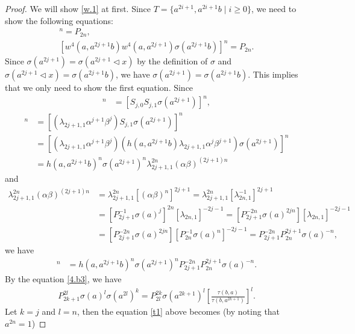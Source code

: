 \documentclass[a4paper,11pt]{amsart}
\numberwithin{equation}{section}
\begin{document}
\begin{proof}
We will show  \eqref{w.1} at first. Since $T=\{a^{2i+1},a^{2i+1}b\;|\;i\geq 0\}$, we need to show the following equations:
\begin{gather*}
[w^4(a,a^{2j+1}) w^4(a,a^{2j+1}b) \sigma(a^{2j+1})]^n=P_{2n},\\
[w^4(a,a^{2j+1}b) w^4(a,a^{2j+1}) \sigma(a^{2j+1}b)]^n=P_{2n}.
\end{gather*}
Since $\sigma(a^{2j+1})=\sigma(a^{2j+1}\triangleleft x)$ by the definition of $\sigma$ and $\sigma(a^{2j+1}\triangleleft x)=\sigma(a^{2j+1}b)$, we have $\sigma(a^{2j+1})=\sigma(a^{2j+1}b)$. This implies that we only need to show the first equation. Since
\begin{align*}
[w^4(a,a^{2j+1}) w^4(a,a^{2j+1}b) \sigma(a^{2j+1})]^n&=[S_{j,0} S_{j,1} \sigma(a^{2j+1})]^{n},
\end{align*}
\begin{align*}
[S_{j,0} S_{j,1} \sigma(a^{2j+1})]^{n}&=[(\lambda_{2j+1,1}\alpha^{j+1}\beta^j) S_{j,1} \sigma(a^{2j+1})]^{n}\\
&=[(\lambda_{2j+1,1}\alpha^{j+1}\beta^j) (h(a,a^{2j+1}b)\lambda_{2j+1,1}\alpha^j\beta^{j+1}) \sigma(a^{2j+1})]^{n}\\
&=h(a,a^{2j+1}b)^n \sigma(a^{2j+1})^{n} \lambda_{2j+1,1}^{2n} (\alpha \beta)^{(2j+1)n}
\end{align*}
and
\begin{align*}
\lambda_{2j+1,1}^{2n} (\alpha \beta)^{(2j+1)n} &=\lambda_{2j+1,1}^{2n} [(\alpha \beta)^{n}]^{2j+1}=\lambda_{2j+1,1}^{2n} [\lambda_{2n,1}^{-1}]^{2j+1} \\
&=[P_{2j+1}^{-1} \sigma(a)^j]^{2n} [\lambda_{2n,1}]^{-2j-1}=[P_{2j+1}^{-2n} \sigma(a)^{2jn}] [\lambda_{2n,1}]^{-2j-1}\\
&=[P_{2j+1}^{-2n} \sigma(a)^{2jn}] [P_{2n}^{-1} \sigma(a)^n]^{-2j-1}=P_{2j+1}^{-2n} P_{2n}^{2j+1} \sigma(a)^{-n},
\end{align*}
we have
\begin{align*}
[w^4(a,a^{2j+1}) w^4(a,a^{2j+1}b) \sigma(a^{2j+1})]^n&=h(a,a^{2j+1}b)^n \sigma(a^{2j+1})^{n} P_{2j+1}^{-2n} P_{2n}^{2j+1} \sigma(a)^{-n}.
\end{align*}
By the equation \eqref{4.b3}, we have
\begin{align}
\label{t1} P_{2k+1}^{2l}\sigma(a)^l \sigma(a^{2l})^k=P_{2l}^{2k}\sigma(a^{2k+1})^l
[\frac{\tau(b,a)}{\tau(b,a^{2k+1})}]^l.
\end{align}
Let $k=j$ and $l=n$, then the equation \eqref{t1} above becomes (by noting that $a^{2n}=1$)

\end{proof}
\end{document}
